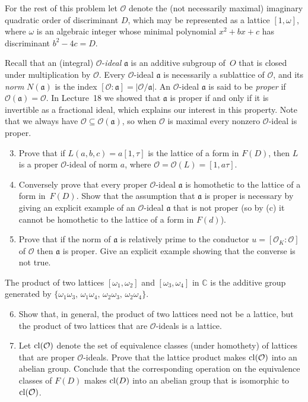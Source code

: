 \documentclass[11pt]{article}
\newcommand{\C}{\mathbb{C}}
\renewcommand{\O}{\mathcal{O}}
\newcommand{\cl}{{\rm cl}}
\renewcommand{\a}{\mathfrak{a}}
\theoremstyle{definition}
\begin{document}
For the rest of this problem let $\O$ denote the (not necessarily maximal) imaginary quadratic order of discriminant $D$,
which may be represented as a lattice $[1,\omega]$, where $\omega$ is an algebraic integer whose minimal polynomial $x^2+bx+c$ has discriminant $b^2-4c=D$.

Recall that an (integral) $\O$-\emph{ideal} $\a$ is an additive subgroup of~$O$ that is closed under multiplication by $\O$.
Every $\O$-ideal $\a$ is necessarily a sublattice of $\O$, and its \emph{norm} $N(\a)$ is the index $[\O:\a]=|\O/\a|$.
An $\O$-ideal $\a$ is said to be \emph{proper} if $\O(\a)=\O$.
In Lecture~18 we showed that $\a$ is proper if and only if it is invertible as a fractional ideal, which explains our interest in this property.
Note that we always have $\O\subseteq \O(\a)$, so when $\O$ is maximal every nonzero $\O$-ideal is proper.

\begin{enumerate}[{\bf(a)}]
\setcounter{enumi}{2}
\item Prove that if $L(a,b,c)=a[1,\tau]$ is the lattice of a form in $F(D)$, then $L$ is a proper $\O$-ideal of norm $a$, where $\O=\O(L)=[1,a\tau]$.

\item Conversely prove that every proper $\O$-ideal $\a$ is homothetic to the lattice of a form in~$F(D)$.
Show that the assumption that $\a$ is proper is necessary by giving an explicit example of an $\O$-ideal $\a$ that is not proper (so by (c) it cannot be homothetic to the lattice of a form in $F(d)$).

\item Prove that if the norm of $\a$ is relatively prime to the conductor $u=[\O_K\colon \O]$ of $\O$ then $\a$ is proper.
Give an explicit example showing that the converse is not true.
\end{enumerate}


The product of two lattices $[\omega_1,\omega_2]$ and $[\omega_3,\omega_4]$ in $\C$ is the additive group generated by $\{\omega_1\omega_3,\, \omega_1\omega_4,\, \omega_2\omega_3,\, \omega_2\omega_4\}$.


\begin{enumerate}[{\bf(a)}]
\setcounter{enumi}{5}
\item Show that, in general, the product of two lattices need not be a lattice, but the product of two lattices that are $\O$-ideals is a lattice.

\item
Let $\cl(\O)$ denote the set of equivalence classes (under homothety) of lattices that are proper $\O$-ideals.
Prove that the lattice product makes $\cl(\O)$ into an abelian group.
Conclude that the corresponding operation on the equivalence classes of $F(D)$ makes $\cl(D)$ into an abelian group that is isomorphic to $\cl(\O)$.
\end{enumerate}
\end{document}
